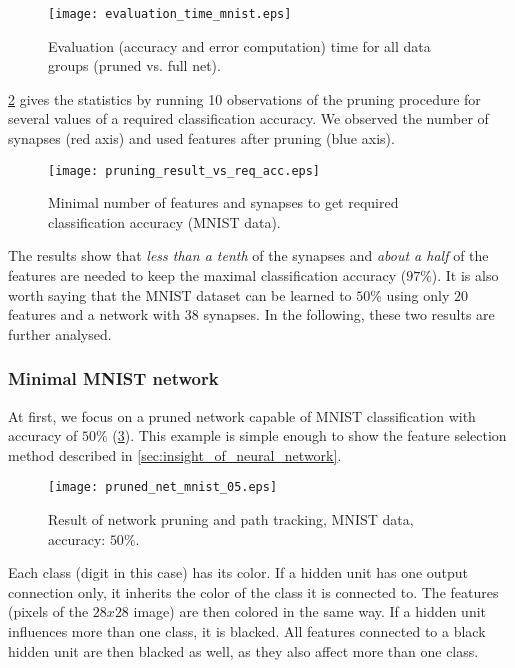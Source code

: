 \begin{figure}[H]
\centering
\texttt{[image: evaluation\_time\_mnist.eps]}
\caption{Evaluation (accuracy and error computation) time for all data groups (pruned vs. full net).}
\label{fig:examples:evaluation_time_mnist}
\end{figure}

 \cref{fig:examples:mnist_pruning_vs_req_acc} gives the statistics by running 10 observations of the pruning procedure for several values of a required classification accuracy. We observed the number of synapses (red axis) and used features after pruning (blue axis).

\begin{figure}[H]
\centering
\texttt{[image: pruning\_result\_vs\_req\_acc.eps]}
\caption{Minimal number of features and synapses to get required classification accuracy (MNIST data).}
\label{fig:examples:mnist_pruning_vs_req_acc}
\end{figure}

The results show that \textit{less than a tenth} of the synapses and \textit{about a half} of the features are needed to keep the maximal classification accuracy ($ 97\% $). It is also worth saying that the MNIST dataset can be learned to $ 50\% $ using only $ 20 $ features and a network with $ 38 $ synapses. In the following, these two results are further analysed.

\subsubsection*{Minimal MNIST network}
At first, we focus on a pruned network capable of MNIST classification with accuracy of $ 50\% $ (\cref{fig:examples:pruned_net_mnist_05}). This example is simple enough to show the feature selection method described in \cref{sec:insight_of_neural_network}.

\begin{figure}[H]
\centering
\texttt{[image: pruned\_net\_mnist\_05.eps]}
\caption{Result of network pruning and path tracking, MNIST data, accuracy: $ 50\% $.}
\label{fig:examples:pruned_net_mnist_05}
\end{figure}

Each class (digit in this case) has its color. If a hidden unit has one output connection only, it inherits the color of the class it is connected to. The features (pixels of the $ 28x28 $ image) are then colored in the same way. If a hidden unit influences more than one class, it is blacked. All features connected to a black hidden unit are then blacked as well, as they also affect more than one class.

